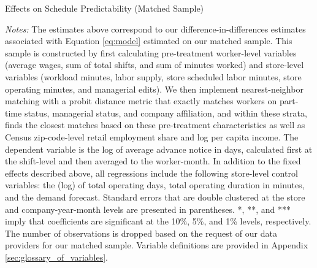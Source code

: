 \documentclass[letterpaper,11pt,leqno]{article}
\theoremstyle{paper}
\newcommand{\note}[2][]{\parbox{\textwidth}{\footnotesize\vspace*{10pt}\textit{#1}#2}}
\begin{document}
\begin{singlespace}
\begin{table}[H]
\caption{Effects on Schedule Predictability (Matched Sample)}

\note{\scriptsize\textit{Notes: }The estimates above correspond to our difference-in-differences estimates associated with Equation \ref{eq:model} estimated on our matched sample. This sample is constructed by first calculating pre-treatment worker-level variables (average wages, sum of total shifts, and sum of minutes worked) and store-level variables (workload minutes, labor supply, store scheduled labor minutes, store operating minutes, and managerial edits). We then implement nearest-neighbor matching with a probit distance metric that exactly matches workers on part-time status, managerial status, and company affiliation, and within these strata, finds the closest matches based on these pre-treatment characteristics as well as Census zip-code-level retail employment share and log per capita income. The dependent variable is the log of average advance notice in days, calculated first at the shift-level and then averaged to the worker-month. In addition to the fixed effects described above, all regressions include the following store-level control variables: the (log) of total operating days, total operating duration in minutes, and the demand forecast. Standard errors that are double clustered at the store and company-year-month levels are presented in parentheses. *, **, and *** imply that coefficients are significant at the 10\%, 5\%, and 1\% levels, respectively. The number of observations is dropped based on the request of our data providers for our matched sample. Variable definitions are provided in Appendix \ref{sec:glossary_of_variables}.}
\label{table:adv_notice_matched}
\end{table}
\end{singlespace}
\end{document}
